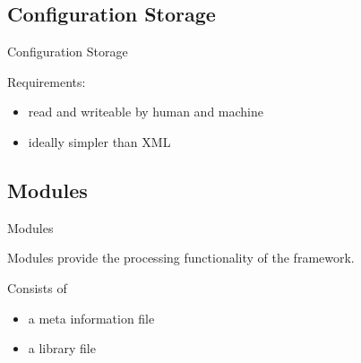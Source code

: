 \documentclass{beamer}
\begin{document}
\subsection{Configuration Storage}
\begin{frame}{Configuration Storage}

	\Large
	Requirements:

	\vspace{1cm}
	\begin{itemize}
		\item read and writeable by human and machine
		\item ideally simpler than XML
	\end{itemize}


\end{frame}

\subsection{Modules}
\begin{frame}{Modules}

	Modules provide the processing functionality of the framework.

\pause
	\vspace{1cm}
	\Large
	Consists of
	\begin{itemize}
		\item a meta information file
		\item a library file
	\end{itemize}

\end{frame}
\end{document}
